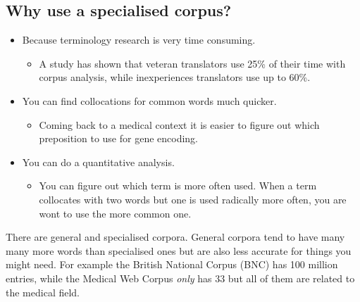 \documentclass{article}
\begin{document}
	\subsection{Why use a specialised corpus?}
	\begin{itemize}
		\item{Because terminology research is very time consuming.}
		\begin{itemize}
			\item{A study has shown that veteran translators use 25\% of their time with corpus analysis, while inexperiences translators use up to 60\%.}
		\end{itemize}
		\item{You can find collocations for common words much quicker.}
		\begin{itemize}
			\item{Coming back to a medical context it is easier to figure out which preposition to use for gene encoding.}
		\end{itemize}
		\item{You can do a quantitative analysis.}
		\begin{itemize}
			\item{You can figure out which term is more often used. When a term collocates with two words but one is used radically more often, you are wont to use the more common one.}
		\end{itemize}
	\end{itemize}

	There are general and specialised corpora. General corpora tend to have many many more words than specialised ones but are also less accurate for things you might need. For example the British National Corpus (BNC) has 100 million entries, while the Medical Web Corpus \textit{only} has 33 but all of them are related to the medical field.\\
	

	

















	
\end{document}
